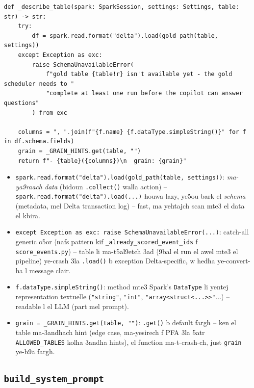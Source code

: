 \documentclass[11pt,a4paper]{report}
\DeclareRobustCommand{\code}[1]{\texttt{#1}}
\begin{document}
\begin{lstlisting}[style=pystyle]
def _describe_table(spark: SparkSession, settings: Settings, table: str) -> str:
    try:
        df = spark.read.format("delta").load(gold_path(table, settings))
    except Exception as exc:
        raise SchemaUnavailableError(
            f"gold table {table!r} isn't available yet - the gold scheduler needs to "
            "complete at least one run before the copilot can answer questions"
        ) from exc

    columns = ", ".join(f"{f.name} {f.dataType.simpleString()}" for f in df.schema.fields)
    grain = _GRAIN_HINTS.get(table, "")
    return f"- {table}({columns})\n  grain: {grain}"
\end{lstlisting}

\begin{itemize}
  \item \code{spark.read.format("delta").load(gold\_path(table, settings))}:
        \emph{ma-ya9raach data} (bidoun \code{.collect()} walla action) --
        \code{spark.read.format("delta").load(...)} houwa lazy, ye5ou
        bark el \emph{schema} (metadata, mel Delta transaction log) --
        fast, ma yehtajch scan mte3 el data el kbira.
  \item \code{except Exception as exc: raise SchemaUnavailableError(...)}:
        catch-all generic o5or (nafs pattern kif
        \code{\_already\_scored\_event\_ids} f \code{score\_events.py})
        -- table li ma-t5al9etch 3ad (9bal el run el awel mte3 el
        pipeline) ye-crash 3la \code{.load()} b exception Delta-specific,
        w hedha ye-convert-ha l message clair.
  \item \code{f.dataType.simpleString()}: method mte3 Spark's \code{DataType}
        li yentej representation textuelle (\code{"string"}, \code{"int"},
        \code{"array<struct<...>>"}...) -- readable l el LLM (part mel
        prompt).
  \item \code{grain = \_GRAIN\_HINTS.get(table, "")}: \code{.get()} b
        default fargh -- ken el table ma-3andhach hint (edge case,
        ma-yesirech f PFA 3la 5atr \code{ALLOWED\_TABLES} kolha 3andha
        hints), el function ma-t-crash-ch, just \code{grain} ye-b9a
        fargh.
\end{itemize}

\subsection{\code{build\_system\_prompt}}
\end{document}
